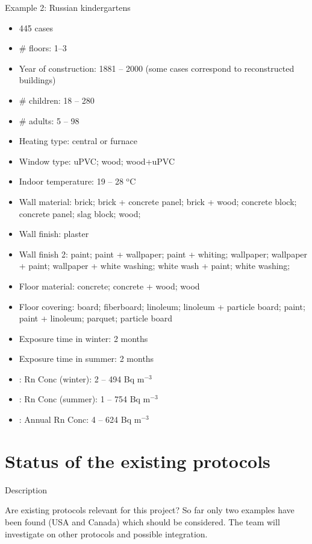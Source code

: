 \documentclass[xcolor=svgnames]{beamer}
\newcommand{\1}{\'{\i}}
\begin{document}
\begin{frame}[allowframebreaks]{Example 2: Russian kindergartens}

\begin{itemize}
\item 445 cases
\item \# floors: 1--3
\item Year of construction: 1881 -- 2000 (some cases correspond to reconstructed buildings)
\item \# children: 18 -- 280
\item \# adults: 5 -- 98
\item Heating type: central or furnace
\item Window type: uPVC; wood; wood+uPVC
\item Indoor temperature: 19 -- 28 $^{\mathrm{o}}$C
\item Wall material: brick; brick + concrete panel; brick + wood; concrete block; concrete panel; slag block; wood; 
\item Wall finish: plaster
\item Wall finish 2: paint; paint + wallpaper; paint + whiting; wallpaper; wallpaper + paint; wallpaper + white washing; white wash + paint; white washing; 
\item Floor material: concrete; concrete + wood; wood
\item Floor covering: board; fiberboard;  linoleum; linoleum + particle board; paint; paint + linoleum; parquet; particle board
\item Exposure time in winter: 2 months
\item Exposure time in summer: 2 months
\item: Rn Conc (winter): 2 -- 494 Bq m$^{-3}$
\item: Rn Conc (summer): 1 -- 754 Bq m$^{-3}$
\item: Annual Rn Conc: 4 -- 624 Bq m$^{-3}$
\end{itemize}

\end{frame}

\section[Protocols]{Status of the existing protocols}

\frame{\tableofcontents[currentsection]}

\begin{frame}{Description}

Are existing protocols relevant for this project? So far only two examples have been found (USA and Canada) which should be considered. The team will investigate on other protocols and possible integration.

\end{frame}
\end{document}
